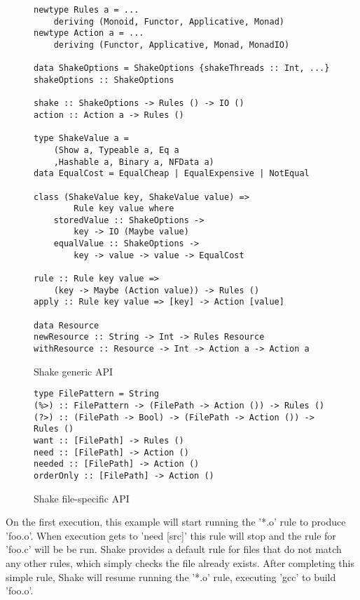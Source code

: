 \begin{figure}
\begin{lstlisting}
newtype Rules a = ...
    deriving (Monoid, Functor, Applicative, Monad)
newtype Action a = ...
    deriving (Functor, Applicative, Monad, MonadIO)

data ShakeOptions = ShakeOptions {shakeThreads :: Int, ...}
shakeOptions :: ShakeOptions

shake :: ShakeOptions -> Rules () -> IO ()
action :: Action a -> Rules ()

type ShakeValue a =
    (Show a, Typeable a, Eq a
    ,Hashable a, Binary a, NFData a)
data EqualCost = EqualCheap | EqualExpensive | NotEqual

class (ShakeValue key, ShakeValue value) =>
        Rule key value where
    storedValue :: ShakeOptions ->
        key -> IO (Maybe value)
    equalValue :: ShakeOptions ->
        key -> value -> value -> EqualCost

rule :: Rule key value =>
    (key -> Maybe (Action value)) -> Rules ()
apply :: Rule key value => [key] -> Action [value]

data Resource
newResource :: String -> Int -> Rules Resource
withResource :: Resource -> Int -> Action a -> Action a
\end{lstlisting}
\caption{Shake generic API\label{fig:shake_generic_api}}
\end{figure}

\begin{figure}
\begin{lstlisting}
type FilePattern = String
(%>) :: FilePattern -> (FilePath -> Action ()) -> Rules ()
(?>) :: (FilePath -> Bool) -> (FilePath -> Action ()) -> Rules ()
want :: [FilePath] -> Rules ()
need :: [FilePath] -> Action ()
needed :: [FilePath] -> Action ()
orderOnly :: [FilePath] -> Action ()
\end{lstlisting}
\caption{Shake file-specific API\label{fig:shake_file_api}}
\end{figure}

On the first execution, this example will start running the \lst'*.o' rule to produce \lst'foo.o'. When execution gets to \lst'need [src]' this rule will stop and the rule for \lst'foo.c' will be be run. Shake provides a default rule for files that do not match any other rules, which simply checks the file already exists. After completing this simple rule, Shake will resume running the \lst'*.o' rule, executing \lst'gcc' to build \lst'foo.o'.


